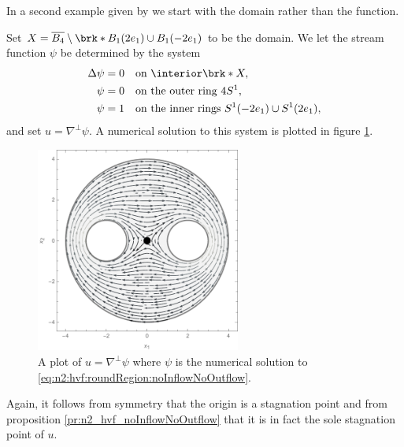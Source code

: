 In a second example given by \cite{Wahlen2023} we start with the domain rather than the function.
\begin{example}
  Set $X=\overline{B_4}\setminus\brk*{B_1(2e_1)\cup B_1(-2e_1)}$ to be the domain.
  We let the stream function $\psi$ be determined by the system
  \begin{equation}
    \begin{aligned}
      \Delta \psi&=0 &&\text{on }\openX, \\
      \psi&=0 &&\text{on the outer ring }4S^1, \\
      \psi&=1 &&\text{on the inner rings }S^1(-2e_1)\cup S^1(2e_1),
    \end{aligned}\label{eq:n2:hvf:roundRegion:noInflowNoOutflow}
  \end{equation}
  and set $u=\nabla^\perp\psi$.
  A numerical solution to this system is plotted in figure \ref{pl:n2_hvf_roundRegion_noInflowNoOutflow}.
  \begin{figure}
    \centering
    \includegraphics[width=0.6\textwidth]{../Plots/n2_hvf_roundRegion_noInflowNoOutflow_gray_2.pdf}
    \caption{A plot of $u=\nabla^\perp\psi$ where $\psi$ is the numerical solution to
    \eqref{eq:n2:hvf:roundRegion:noInflowNoOutflow}.}
    \label{pl:n2_hvf_roundRegion_noInflowNoOutflow}
  \end{figure}
  Again, it follows from symmetry that the origin is a stagnation point and
  from proposition \ref{pr:n2_hvf_noInflowNoOutflow} that it is in fact the sole stagnation point of $u$.
\end{example}

